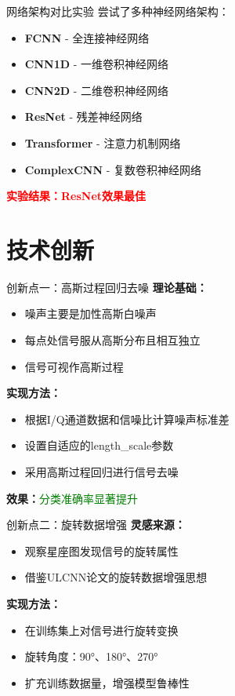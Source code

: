 \documentclass[aspectratio=169]{beamer}
\begin{document}
\begin{frame}{网络架构对比实验}
尝试了多种神经网络架构：

\begin{itemize}
    \item \textbf{FCNN} - 全连接神经网络
    \item \textbf{CNN1D} - 一维卷积神经网络
    \item \textbf{CNN2D} - 二维卷积神经网络
    \item \textbf{ResNet} - 残差神经网络
    \item \textbf{Transformer} - 注意力机制网络
    \item \textbf{ComplexCNN} - 复数卷积神经网络
\end{itemize}

\vspace{0.5em}
\textcolor{red}{\textbf{实验结果：ResNet效果最佳}}
\end{frame}

\section{技术创新}

\begin{frame}{创新点一：高斯过程回归去噪}
\textbf{理论基础：}
\begin{itemize}
    \item 噪声主要是加性高斯白噪声
    \item 每点处信号服从高斯分布且相互独立
    \item 信号可视作高斯过程
\end{itemize}

\textbf{实现方法：}
\begin{itemize}
    \item 根据I/Q通道数据和信噪比计算噪声标准差
    \item 设置自适应的length\_scale参数
    \item 采用高斯过程回归进行信号去噪
\end{itemize}

\textbf{效果：}\textcolor{green}{分类准确率显著提升}
\end{frame}

\begin{frame}{创新点二：旋转数据增强}
\textbf{灵感来源：}
\begin{itemize}
    \item 观察星座图发现信号的旋转属性
    \item 借鉴ULCNN论文的旋转数据增强思想
\end{itemize}

\textbf{实现方法：}
\begin{itemize}
    \item 在训练集上对信号进行旋转变换
    \item 旋转角度：90°、180°、270°
    \item 扩充训练数据量，增强模型鲁棒性
\end{itemize}
\end{frame}
\end{document}
